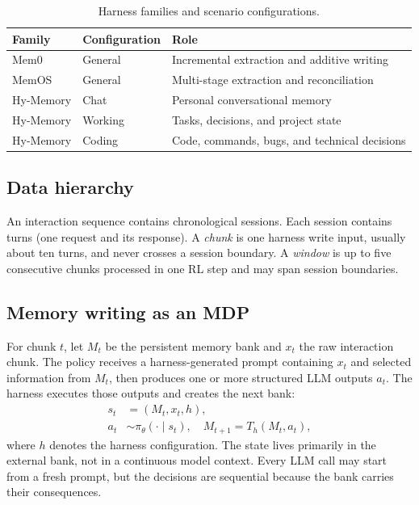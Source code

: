 \documentclass{article}
\renewcommand{\arraystretch}{1.08}
\begin{document}
\begin{table}[t]
\centering
\small
\setlength{\tabcolsep}{5pt}
\renewcommand{\arraystretch}{1.12}
\begin{tabularx}{\linewidth}{@{}p{1.95cm}p{2.05cm}Y@{}}
\toprule
Family & Configuration & Role \\
\midrule
Mem0 & General & Incremental extraction and additive writing \\
MemOS & General & Multi-stage extraction and reconciliation \\
Hy-Memory & Chat & Personal conversational memory \\
Hy-Memory & Working & Tasks, decisions, and project state \\
Hy-Memory & Coding & Code, commands, bugs, and technical decisions \\
\bottomrule
\end{tabularx}
\caption{Harness families and scenario configurations.}
\label{tab:harness}
\end{table}

\subsection{Data hierarchy}

An interaction sequence contains chronological sessions. Each session contains turns (one request and its response). A \emph{chunk} is one harness write input, usually about ten turns, and never crosses a session boundary. A \emph{window} is up to five consecutive chunks processed in one RL step and may span session boundaries.

\subsection{Memory writing as an MDP}

For chunk $t$, let $M_t$ be the persistent memory bank and $x_t$ the raw interaction chunk. The policy receives a harness-generated prompt containing $x_t$ and selected information from $M_t$, then produces one or more structured LLM outputs $a_t$. The harness executes those outputs and creates the next bank:
\begin{align}
s_t &= (M_t,x_t,h), \nonumber \\
a_t &\sim \pi_\theta(\cdot\mid s_t), \quad
M_{t+1}=T_h(M_t,a_t),
\end{align}
where $h$ denotes the harness configuration. The state lives primarily in the external bank, not in a continuous model context. Every LLM call may start from a fresh prompt, but the decisions are sequential because the bank carries their consequences.
\end{document}
